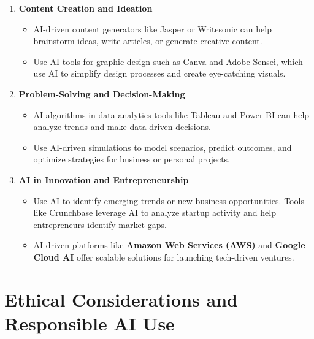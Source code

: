 \documentclass[
  letterpaper,
  DIV=11,
  numbers=noendperiod]{scrreprt}
\providecommand{\tightlist}{%
  \setlength{\itemsep}{0pt}\setlength{\parskip}{0pt}}\usepackage{longtable,booktabs,array}
\begin{document}
\begin{enumerate}
\def\labelenumi{\arabic{enumi}.}
\item
  \textbf{Content Creation and Ideation}

  \begin{itemize}
  \tightlist
  \item
    AI-driven content generators like Jasper or Writesonic can help
    brainstorm ideas, write articles, or generate creative content.
  \item
    Use AI tools for graphic design such as Canva and Adobe Sensei,
    which use AI to simplify design processes and create eye-catching
    visuals.
  \end{itemize}
\item
  \textbf{Problem-Solving and Decision-Making}

  \begin{itemize}
  \tightlist
  \item
    AI algorithms in data analytics tools like Tableau and Power BI can
    help analyze trends and make data-driven decisions.
  \item
    Use AI-driven simulations to model scenarios, predict outcomes, and
    optimize strategies for business or personal projects.
  \end{itemize}
\item
  \textbf{AI in Innovation and Entrepreneurship}

  \begin{itemize}
  \tightlist
  \item
    Use AI to identify emerging trends or new business opportunities.
    Tools like Crunchbase leverage AI to analyze startup activity and
    help entrepreneurs identify market gaps.
  \item
    AI-driven platforms like \textbf{Amazon Web Services (AWS)} and
    \textbf{Google Cloud AI} offer scalable solutions for launching
    tech-driven ventures.
  \end{itemize}
\end{enumerate}

\section{Ethical Considerations and Responsible AI
Use}\label{ethical-considerations-and-responsible-ai-use}
\end{document}
